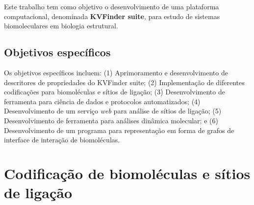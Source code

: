 \documentclass[Portugues]{phdquali}
\begin{document}
Este trabalho tem como objetivo o desenvolvimento de uma plataforma computacional, denominada \textbf{KVFinder suite}, para estudo de sistemas biomoleculares em biologia estrutural.

\section{Objetivos específicos}


Os objetivos específicos incluem: (1) Aprimoramento e desenvolvimento de descritores de propriedades do KVFinder suite; (2) Implementação de diferentes codificações para biomoléculas e sítios de ligação; (3) Desenvolvimento de ferramenta para ciência de dados e protocolos automatizados; (4) Desenvolvimento de um serviço \textit{web} para análise de sítios de ligação; (5) Desenvolvimento de ferramenta para análises dinâmica molecular; e (6) Desenvolvimento de um programa para representação em forma de grafos de interface de interação de biomoléculas.


\chapter{Codificação de biomoléculas e sítios de ligação}

\end{document}
